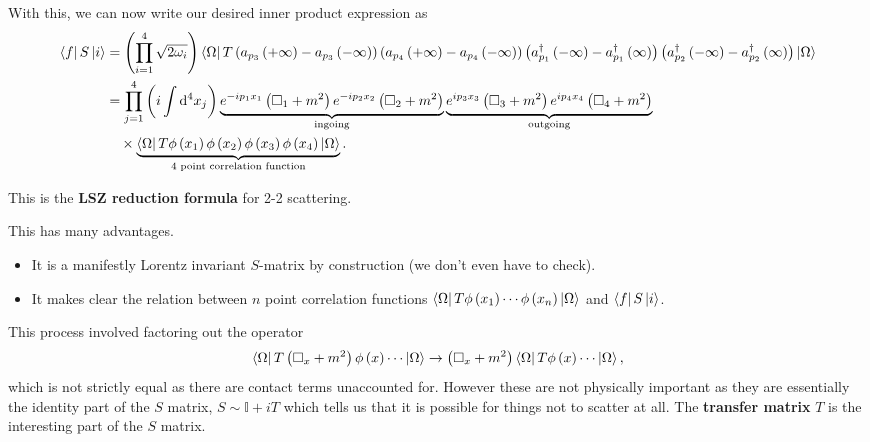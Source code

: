 With this, we can now write our desired inner product expression as
\begin{align}
    \bra{f} S \ket{i} 
    &= \left( \prod_{i = 1}^{4} \sqrt{2 \omega_i}   \right) \bra{\Omega} T \left( a_{p_3} \left( + \infty \right) - a_{p_3} \left( -\infty \right)  \right)  \left( a_{p_4} \left( + \infty \right) - a_{p_4} \left( -\infty \right)  \right)  \left( a_{p_1}^{\dag} \left( - \infty \right) - a_{p_1}^{\dag} \left( \infty \right)  \right)   \left( a_{p_2}^{\dag} \left( - \infty \right) - a_{p_2}^{\dag} \left( \infty \right)  \right)  \ket{\Omega} \\
    &= \prod_{j=1}^{4} \left( i \int \dd{^{4}x_j} \right)  \underbrace{e^{-i p_1 x_1} \left( \Box_1 + m^2 \right) e^{-i p_2 x_2} \left( \Box_2 + m^2 \right)}_{\text{ingoing}} \underbrace{e^{i p_3 x_3} \left( \Box_3 + m^2 \right) e^{ip_4 x_4} \left( \Box_4 + m^2 \right)}_{\text{outgoing}} \nonumber \\
    &\quad \times \underbrace{\bra{\Omega} T \phi \left( x_1 \right) \phi \left( x_2 \right) \phi \left( x_3 \right) \phi \left( x_4 \right) \ket{\Omega}}_{\text{4 point correlation function}}  
.\end{align}

This is the \textbf{LSZ reduction formula} for 2-2 scattering.


This has many advantages.
\begin{itemize}
    \item It is a manifestly Lorentz invariant $S$-matrix by construction (we don't even have to check).
    \item It makes clear the relation between $n$ point correlation functions $\bra{\Omega} T \phi \left( x_1 \right) \cdots \phi \left( x_n \right) \ket{\Omega}$ and $\bra{f} S \ket{i}$.
\end{itemize}


\begin{note}
    This process involved factoring out the operator
    \begin{align}
        \bra{\Omega} T \left( \Box_x + m^2 \right) \phi \left( x \right) \cdots \ket{\Omega} \to \left( \Box_x + m^2 \right) \bra{\Omega} T \phi \left( x \right) \cdots \ket{\Omega}
    ,\end{align}
    which is not strictly equal as there are contact terms unaccounted for. However these are not physically important as they are essentially the identity part of the $S$ matrix, $S \sim \mathbb{I} + i T$ which tells us that it is possible for things not to scatter at all. The \textbf{transfer matrix} $T$ is the interesting part of the $S$ matrix.
\end{note}

